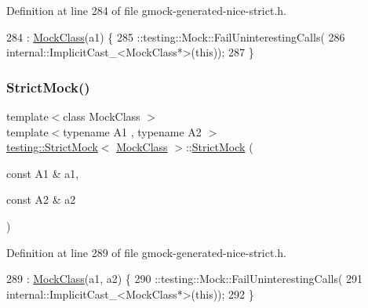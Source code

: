 Definition at line 284 of file gmock-\/generated-\/nice-\/strict.\+h.


\begin{DoxyCode}
284                                     : \hyperlink{classMockClass}{MockClass}(a1) \{
285     ::testing::Mock::FailUninterestingCalls(
286         internal::ImplicitCast\_<MockClass*>(\textcolor{keyword}{this}));
287   \}
\end{DoxyCode}
\mbox{\label{classtesting_1_1StrictMock_a345933f3f1a10de381a508f93e680c6b}} 
\subsubsection{\texorpdfstring{Strict\+Mock()}{StrictMock()}\hspace{0.1cm}{\footnotesize\ttfamily [3/11]}}
{\footnotesize\ttfamily template$<$class Mock\+Class $>$ \\
template$<$typename A1 , typename A2 $>$ \\
\hyperlink{classtesting_1_1StrictMock}{testing\+::\+Strict\+Mock}$<$ \hyperlink{classMockClass}{Mock\+Class} $>$\+::\hyperlink{classtesting_1_1StrictMock}{Strict\+Mock} (\begin{DoxyParamCaption}\item[{const A1 \&}]{a1,  }\item[{const A2 \&}]{a2 }\end{DoxyParamCaption})\hspace{0.3cm}{\ttfamily [inline]}}



Definition at line 289 of file gmock-\/generated-\/nice-\/strict.\+h.


\begin{DoxyCode}
289                                          : \hyperlink{classMockClass}{MockClass}(a1, a2) \{
290     ::testing::Mock::FailUninterestingCalls(
291         internal::ImplicitCast\_<MockClass*>(\textcolor{keyword}{this}));
292   \}
\end{DoxyCode}
\mbox{\label{classtesting_1_1StrictMock_acc25729cd85a3a412106863894a30fe7}} 
